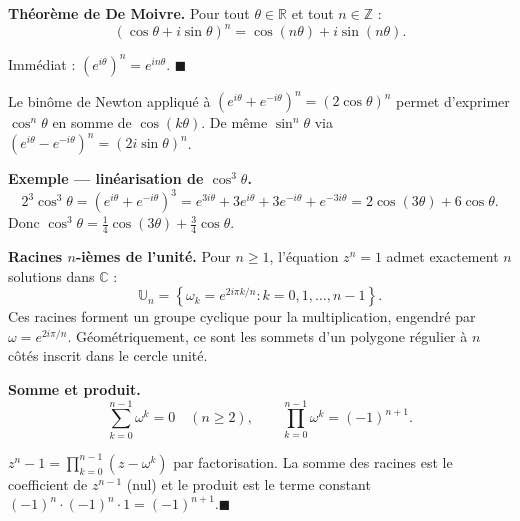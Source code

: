 \decsep{}


\begin{tcolorbox}[thmbox]
  \textbf{Théorème de De Moivre.}\enspace{}
  Pour tout $\theta\in\mathbb{R}$ et tout $n\in\mathbb{Z}$ :
  \[
    {(\cos\theta + i\sin\theta)}^n = \cos(n\theta) + i\sin(n\theta).
  \]
\end{tcolorbox}

\begin{mdframed}[style=proofbar]
  Immédiat : ${(e^{i\theta})}^n = e^{in\theta}$. \hfill$\blacksquare$
\end{mdframed}

Le binôme de Newton appliqué à ${(e^{i\theta}+e^{-i\theta})}^n = {(2\cos\theta)}^n$
permet d'exprimer $\cos^n\theta$ en somme de $\cos(k\theta)$.
De même $\sin^n\theta$ via ${(e^{i\theta}-e^{-i\theta})}^n = {(2i\sin\theta)}^n$.

\begin{mdframed}[style=exbar]
  \textbf{Exemple — linéarisation de $\cos^3\theta$.}
  \[
    2^3\cos^3\theta = {(e^{i\theta}+e^{-i\theta})}^3
    = e^{3i\theta}+3e^{i\theta}+3e^{-i\theta}+e^{-3i\theta}
    = 2\cos(3\theta)+6\cos\theta.
  \]
  Donc $\cos^3\theta = \tfrac{1}{4}\cos(3\theta)+\tfrac{3}{4}\cos\theta$.
\end{mdframed}

\begin{tcolorbox}[thmbox]
  \textbf{Racines $n$-ièmes de l'unité.}\enspace{}
  Pour $n\geq 1$, l'équation $z^n = 1$ admet exactement $n$ solutions dans $\mathbb{C}$ :
  \[
    \mathbb{U}_n = \left\{\omega_k = e^{2i\pi k/n} : k = 0, 1, \ldots, n-1\right\}.
  \]
  Ces racines forment un groupe cyclique pour la multiplication, engendré par
  $\omega = e^{2i\pi/n}$.
  Géométriquement, ce sont les sommets d'un polygone régulier à $n$ côtés
  inscrit dans le cercle unité.

  \medskip
  \textbf{Somme et produit.}
  \[
    \sum_{k=0}^{n-1} \omega^k = 0 \quad (n\geq 2), \qquad
    \prod_{k=0}^{n-1} \omega^k = {(-1)}^{n+1}.
  \]
\end{tcolorbox}

\begin{mdframed}[style=proofbar]
  $z^n - 1 = \prod_{k=0}^{n-1}(z-\omega^k)$ par factorisation.
  La somme des racines est le coefficient de $z^{n-1}$ (nul) et le produit
  est le terme constant ${(-1)}^n\cdot{(-1)}^n\cdot 1 = {(-1)}^{n+1}$.\hfill$\blacksquare$
\end{mdframed}

